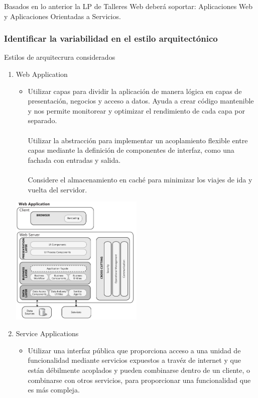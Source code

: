 \documentclass[10pt,a4paper,openany]{book}
\begin{document}
Basados en lo anterior la LP de Talleres Web deberá soportar: Aplicaciones Web y Aplicaciones Orientadas a Servicios.


\subsubsection{Identificar la variabilidad en el estilo arquitectónico}
Estilos de arquitecrura considerados \cite{url3}


\begin{enumerate}
\item Web Application
\begin{itemize}
	\item Utilizar capas para dividir la aplicación de manera lógica en capas de presentación, negocios y acceso a datos. Ayuda a crear código mantenible y nos permite monitorear y optimizar el rendimiento de cada capa por separado.\\\\
Utilizar la abstracción para implementar un acoplamiento flexible entre capas mediante la definición de componentes de interfaz, como una fachada con entradas y salida.\\\\
Considere el almacenamiento en caché para minimizar los viajes de ida y vuelta del servidor.
\end{itemize}
\begin{center}
\includegraphics[width=0.5\textwidth]{arq1}
\end{center}
\item Service Applications
\begin{itemize}
	\item Utilizar una interfaz pública que proporciona acceso a una unidad de funcionalidad mediante servicios expuestos a travéz de internet y que están débilmente acoplados y pueden combinarse dentro de un cliente, o combinarse con otros servicios, para proporcionar una funcionalidad que es más compleja.\\\\

\end{itemize}
\end{enumerate}
\end{document}
